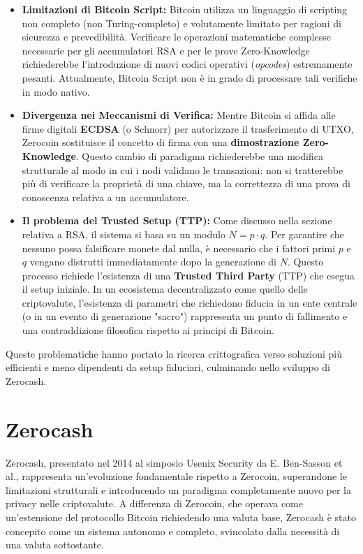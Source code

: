 \begin{itemize}
    \item \textbf{Limitazioni di Bitcoin Script:} Bitcoin utilizza un linguaggio di scripting non completo (non Turing-completo) e volutamente limitato per ragioni di sicurezza e prevedibilità. Verificare le operazioni matematiche complesse necessarie per gli accumulatori RSA e per le prove Zero-Knowledge richiederebbe l'introduzione di nuovi codici operativi (\textit{opcodes}) estremamente pesanti. Attualmente, Bitcoin Script non è in grado di processare tali verifiche in modo nativo.
    
    \item \textbf{Divergenza nei Meccanismi di Verifica:} Mentre Bitcoin si affida alle firme digitali \textbf{ECDSA} (o Schnorr) per autorizzare il trasferimento di UTXO, Zerocoin sostituisce il concetto di firma con una \textbf{dimostrazione Zero-Knowledge}. Questo cambio di paradigma richiederebbe una modifica strutturale al modo in cui i nodi validano le transazioni: non si tratterebbe più di verificare la proprietà di una chiave, ma la correttezza di una prova di conoscenza relativa a un accumulatore.
    
    \item \textbf{Il problema del Trusted Setup (TTP):} Come discusso nella sezione relativa a RSA, il sistema si basa su un modulo $N = p \cdot q$. Per garantire che nessuno possa falsificare monete dal nulla, è necessario che i fattori primi $p$ e $q$ vengano distrutti immediatamente dopo la generazione di $N$. Questo processo richiede l'esistenza di una \textbf{Trusted Third Party} (TTP) che esegua il setup iniziale. In un ecosistema decentralizzato come quello delle criptovalute, l'esistenza di parametri che richiedono fiducia in un ente centrale (o in un evento di generazione "sacro") rappresenta un punto di fallimento e una contraddizione filosofica rispetto ai principi di Bitcoin.
\end{itemize}

Queste problematiche hanno portato la ricerca crittografica verso soluzioni più efficienti e meno dipendenti da setup fiduciari, culminando nello sviluppo di Zerocash.

\section{Zerocash}
Zerocash, presentato nel 2014 al simposio Usenix Security da E. Ben-Sasson et al., rappresenta un'evoluzione fondamentale rispetto a Zerocoin, superandone le limitazioni strutturali e introducendo un paradigma completamente nuovo per la privacy nelle criptovalute. A differenza di Zerocoin, che operava come un'estensione del protocollo Bitcoin richiedendo una valuta base, Zerocash è stato concepito come un sistema autonomo e completo, svincolato dalla necessità di una valuta sottostante.

